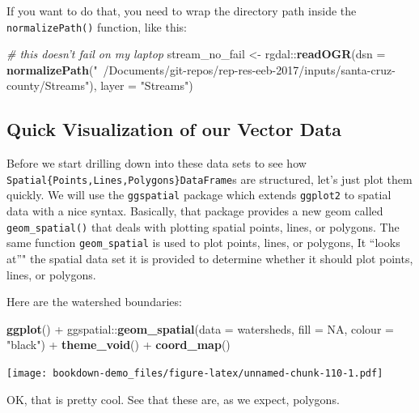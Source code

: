 \documentclass[]{book}
\newenvironment{Shaded}{\begin{snugshade}}{\end{snugshade}}
\newcommand{\KeywordTok}[1]{\textcolor[rgb]{0.13,0.29,0.53}{\textbf{{#1}}}}
\newcommand{\DataTypeTok}[1]{\textcolor[rgb]{0.13,0.29,0.53}{{#1}}}
\newcommand{\StringTok}[1]{\textcolor[rgb]{0.31,0.60,0.02}{{#1}}}
\newcommand{\CommentTok}[1]{\textcolor[rgb]{0.56,0.35,0.01}{\textit{{#1}}}}
\newcommand{\OtherTok}[1]{\textcolor[rgb]{0.56,0.35,0.01}{{#1}}}
\newcommand{\NormalTok}[1]{{#1}}
\theoremstyle{definition}
\theoremstyle{definition}
\theoremstyle{remark}
\begin{document}
If you want to do that, you need to wrap the directory path inside the
\texttt{normalizePath()} function, like this:

\begin{Shaded}
\begin{Highlighting}[]
\CommentTok{# this doesn't fail on my laptop}
\NormalTok{stream_no_fail <-}\StringTok{ }\NormalTok{rgdal::}\KeywordTok{readOGR}\NormalTok{(}\DataTypeTok{dsn =} \KeywordTok{normalizePath}\NormalTok{(}\StringTok{"~/Documents/git-repos/rep-res-eeb-2017/inputs/santa-cruz-county/Streams"}\NormalTok{), }
                              \DataTypeTok{layer =} \StringTok{"Streams"}\NormalTok{)}
\end{Highlighting}
\end{Shaded}

\subsection{Quick Visualization of our Vector
Data}\label{quick-visualization-of-our-vector-data}

Before we start drilling down into these data sets to see how
\texttt{Spatial\{Points,Lines,Polygons\}DataFrame}s are structured,
let's just plot them quickly. We will use the \texttt{ggspatial} package
which extends \texttt{ggplot2} to spatial data with a nice syntax.
Basically, that package provides a new geom called
\texttt{geom\_spatial()} that deals with plotting spatial points, lines,
or polygons. The same function \texttt{geom\_spatial} is used to plot
points, lines, or polygons, It ``looks at''" the spatial data set it is
provided to determine whether it should plot points, lines, or polygons.

Here are the watershed boundaries:

\begin{Shaded}
\begin{Highlighting}[]
\KeywordTok{ggplot}\NormalTok{() +}
\StringTok{  }\NormalTok{ggspatial::}\KeywordTok{geom_spatial}\NormalTok{(}\DataTypeTok{data =} \NormalTok{watersheds, }\DataTypeTok{fill =} \OtherTok{NA}\NormalTok{, }\DataTypeTok{colour =} \StringTok{"black"}\NormalTok{) +}
\StringTok{  }\KeywordTok{theme_void}\NormalTok{() +}
\StringTok{  }\KeywordTok{coord_map}\NormalTok{()}
\end{Highlighting}
\end{Shaded}

\texttt{[image: bookdown-demo\_files/figure-latex/unnamed-chunk-110-1.pdf]}

OK, that is pretty cool. See that these are, as we expect, polygons.
\end{document}
